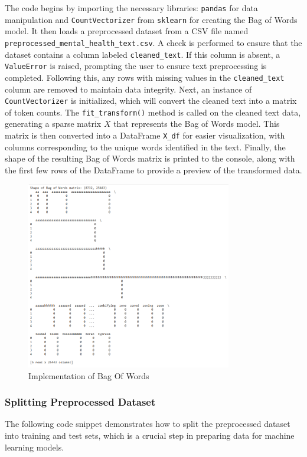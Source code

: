 \noindent
The code begins by importing the necessary libraries: \texttt{pandas} for data manipulation and \texttt{CountVectorizer} from \texttt{sklearn} for creating the Bag of Words model. It then loads a preprocessed dataset from a CSV file named \texttt{preprocessed\_mental\_health\_text.csv}. A check is performed to ensure that the dataset contains a column labeled \texttt{cleaned\_text}. If this column is absent, a \texttt{ValueError} is raised, prompting the user to ensure text preprocessing is completed. Following this, any rows with missing values in the \texttt{cleaned\_text} column are removed to maintain data integrity. Next, an instance of \texttt{CountVectorizer} is initialized, which will convert the cleaned text into a matrix of token counts. The \texttt{fit\_transform()} method is called on the cleaned text data, generating a sparse matrix \(X\) that represents the Bag of Words model. This matrix is then converted into a DataFrame \texttt{X\_df} for easier visualization, with columns corresponding to the unique words identified in the text. Finally, the shape of the resulting Bag of Words matrix is printed to the console, along with the first few rows of the DataFrame to provide a preview of the transformed data.

\begin{figure}[h!]  
    \centering
    \includegraphics[width=0.8\textwidth]{Images/Output BOW.png}  
    \caption{Implementation of Bag Of Words}
    \label{BOW}  %
\end{figure}

\subsubsection{Splitting Preprocessed Dataset}
\noindent
The following code snippet demonstrates how to split the preprocessed dataset into training and test sets, which is a crucial step in preparing data for machine learning models.

